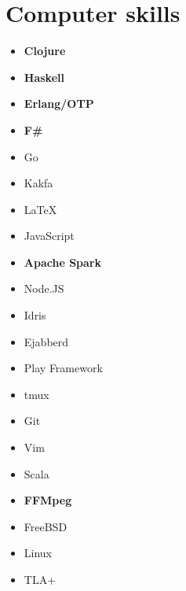 \documentclass[11pt,a4paper,roman,english]{moderncv}        %
\begin{document}



\makecvtitle
\section{Computer skills}
\begin{multicols}{4}
	\begin{itemize}
		\item[] \textbf{Clojure}
		\item[] \textbf{Haskell}
		\item[] \textbf{Erlang/OTP}
		\item[] \textbf{F\#}
		\item[] Go
		\item[] Kakfa
		\item[] \LaTeX
		\item[] JavaScript
		\item[] \textbf{Apache Spark}
		\item[] Node.JS
	        \item[] Idris
		\item[] Ejabberd
		\item[] Play Framework
		\item[] tmux
		\item[] Git
		\item[] Vim
		\item[] Scala
		\item[] \textbf{FFMpeg}
		\item[] FreeBSD
		\item[] Linux
        \item[] TLA+
	\end{itemize}
\end{multicols}
\end{document}
